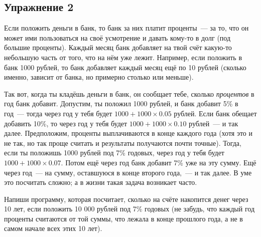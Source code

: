 \subsection*{Упражнение 2}
Если положить деньги в банк, то банк за них платит проценты — за то, что он может ими пользоваться на своё усмотрение и давать кому-то в долг (под большие проценты). Каждый месяц банк добавляет на твой счёт какую-то небольшую часть от того, что на нём уже лежит. Например, если положить в банк 1000 рублей, то банк добавляет каждый месяц ещё по 10 рублей (сколько именно, зависит от банка, но примерно столько или меньше).

Так вот, когда ты кладёшь деньги в банк, он сообщает тебе, сколько \emph{процентов} в год банк добавит. Допустим, ты положил 1000 рублей, и банк добавит 5\% в год — тогда через год у тебя будет $1000 + 1000×0.05$ рублей. Если банк обещает добавить 10\%, то через год у тебя будет $1000+1000×0.10$ рублей — и так далее. Предположим, проценты выплачиваются в конце каждого года (хотя это и не так, но так проще считать и результаты получаются почти точные). Тогда, если ты положишь 1000 рублей под 7\% годовых, через год у тебя будет $1000+1000×0.07$. Потом ещё через год банк добавит 7\% уже на эту сумму. Ещё через год — на сумму, оставшуюся в конце второго года, — и так далее. В уме это посчитать сложно; а в жизни такая задача возникает часто.

Напиши программу, которая посчитает, сколько на счёте накопится денег через 10 лет, если положить 10 000 рублей под 7\% годовых (не забудь, что каждый год проценты считаются от той суммы, что лежала в конце прошлого года, а не в самом начале всех этих 10 лет).
\newpage